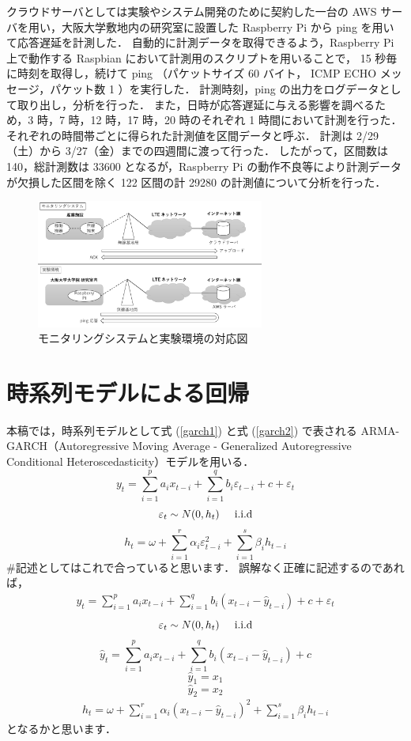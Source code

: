 \documentclass[technicalreport]{ieicej}
\begin{document}
クラウドサーバとしては実験やシステム開発のために契約した一台の AWS サーバを用い，大阪大学敷地内の研究室に設置した Raspberry Pi から ping を用いて応答遅延を計測した．
自動的に計測データを取得できるよう，Raspberry Pi 上で動作する Raspbian において計測用のスクリプトを用いることで， 15 秒毎に時刻を取得し，続けて ping （パケットサイズ 60 バイト， ICMP ECHO メッセージ，パケット数 1 ）を実行した．
計測時刻，ping の出力をログデータとして取り出し，分析を行った．
また，日時が応答遅延に与える影響を調べるため，3 時，7 時，12 時，17 時，20 時のそれぞれ 1 時間において計測を行った．
それぞれの時間帯ごとに得られた計測値を区間データと呼ぶ．
計測は 2/29（土）から 3/27（金）までの四週間に渡って行った．
したがって，区間数は 140，総計測数は 33600 となるが，Raspberry Pi の動作不良等により計測データが欠損した区間を除く 122 区間の計 29280 の計測値について分析を行った．

\begin{figure}[tb]
\centering
\includegraphics[width=7.5cm]{experiment.pdf}
\caption{モニタリングシステムと実験環境の対応図}
\label{exp}
\end{figure}

\section{時系列モデルによる回帰}
本稿では，時系列モデルとして式 (\ref{garch1}) と式 (\ref{garch2}) で表される ARMA-GARCH（Autoregressive Moving Average - Generalized Autoregressive Conditional Heteroscedasticity）モデル\cite{arma-garch}を用いる．
\begin{equation}
y_t = \sum_{i=1}^p a_i x_{t-i} + \sum_{i=1}^q b_i \varepsilon_{t-i} + c + \varepsilon_{t} 
\label{garch1}
\end{equation}
$$\varepsilon_t \sim N(0,h_t) \hspace{0.5cm} \rm{i.i.d}$$
\begin{equation}
\displaystyle h_{t} = \omega + \sum_{i=1}^{r}\alpha_i\varepsilon_{t-i}^2 + \sum_{i=1}^{s}\beta_ih_{t-i}
\label{garch2}
\end{equation}
\#記述としてはこれで合っていると思います．
誤解なく正確に記述するのであれば，
\begin{eqnarray*}
y_t = \sum_{i=1}^p a_i x_{t-i} + \sum_{i=1}^q b_i (x_{t-i} - \widehat{y}_{t-i}) + c + \varepsilon_{t} 
\end{eqnarray*}
$$\varepsilon_t \sim N(0,h_t) \hspace{0.5cm} \rm{i.i.d}$$
$$\widehat{y}_t = \sum_{i=1}^p a_i x_{t-i} + \sum_{i=1}^q b_i (x_{t-i} - \widehat{y}_{t-i}) + c$$
$$\widehat{y}_{1} = x_1$$
$$\widehat{y}_{2} = x_2$$
\begin{eqnarray*}
\displaystyle h_{t} = \omega + \sum_{i=1}^{r}\alpha_i(x_{t-i} - \widehat{y}_{t-i})^2 + \sum_{i=1}^{s}\beta_ih_{t-i}
\end{eqnarray*}
となるかと思います．
\end{document}
